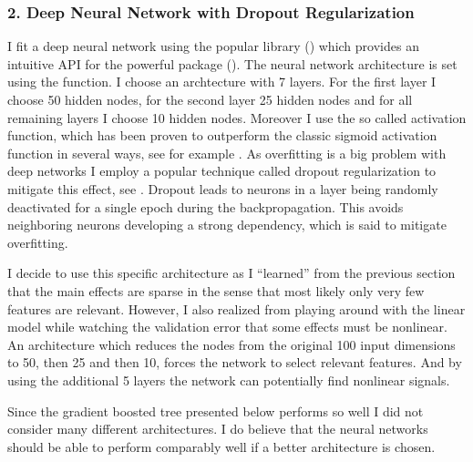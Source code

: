 \documentclass[letterpaper,10pt,english]{sphinxmanual}
\begin{document}
\subsubsection{2. Deep Neural Network with Dropout Regularization}
\label{\detokenize{simulated_final:deep-neural-network-with-dropout-regularization}}
I fit a deep neural network using the popular  library () which provides an intuitive API for the powerful  package (). The neural network architecture is set using the  function. I choose an archtecture with 7 layers. For the first layer I choose 50 hidden nodes, for the second layer 25 hidden nodes and for all remaining layers I choose 10 hidden nodes. Moreover I use the so called  activation function, which has been proven to outperform the classic sigmoid activation function in several ways, see for example . As overfitting is a big problem with deep networks I employ a popular technique called dropout regularization to mitigate this effect, see . Dropout leads to neurons in a layer being randomly deactivated for a single epoch during the backpropagation. This avoids neighboring neurons developing a strong dependency, which is said to mitigate overfitting.

 I decide to use this specific architecture as I “learned” from the previous section that the main effects are sparse in the sense that most likely only very few features are relevant. However, I also realized from playing around with the linear model while watching the validation error that some effects must be non\sphinxhyphen{}linear. An architecture which reduces the nodes from the original 100 input dimensions to 50, then 25 and then 10, forces the network to select relevant features. And by using the additional 5 layers the network can potentially find non\sphinxhyphen{}linear signals.

 Since the gradient boosted tree presented below performs so well I did not consider many different architectures. I do believe that the neural networks should be able to perform comparably well if a better architecture is chosen.
\end{document}
